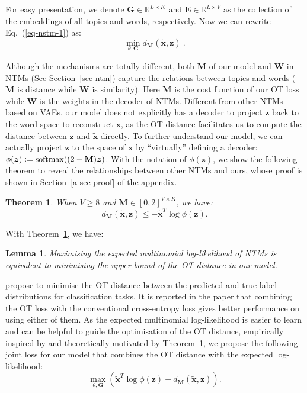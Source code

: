 \documentclass{article}
\newtheorem{thm}{Theorem}
\newtheorem{lemma}{Lemma}
\renewcommand{\vec}{\boldsymbol}
\newcommand{\matr}[1]{\mathbf{#1}}
\newcommand{\eqdef}{\vcentcolon=}
\begin{document}
For easy presentation, we denote $\matr{G} \in \mathbb{R}^{L \times K}$ and $\matr{E} \in \mathbb{R}^{L \times V}$ as the collection of the embeddings of all topics and words, respectively. Now we can rewrite Eq.~(\ref{eq-nstm-1}) as:
\begin{equation}
\label{eq-nstm-2}
\min_{\theta, \matr{G}} d_{\matr{M}}(\tilde{\vec{x}}, \vec{z})~.
\end{equation}


Although the mechanisms are totally different, both $\matr{M}$ of our model and $\matr{W}$ in NTMs (See Section~\ref{sec-ntm}) capture the relations between topics and words ($\matr{M}$ is distance while $\matr{W}$ is similarity).
Here $\matr{M}$ is the cost function of our OT loss while $\matr{W}$ is the weights in the decoder of NTMs.
Different from other NTMs based on VAEs, our model does not explicitly has a decoder to project $\vec{z}$ back to the word space to reconstruct $\vec{x}$, as the OT distance facilitates us to compute the distance between $\vec{z}$ and $\tilde{\vec{x}}$ directly.
To further understand our model, we can actually project $\vec{z}$ to the space of $\vec{x}$ by ``virtually'' defining a decoder: $\phi(\vec{z}) \eqdef \text{softmax}((2 - \matr{M}) \vec{z})$. With the notation of $\phi(\vec{z})$, we show the following theorem to reveal the relationships between other NTMs and ours, whose proof is shown in Section~\ref{a-sec-proof} of the appendix.
\begin{thm}
\label{thm}
When $V\ge8$ and $\matr{M} \in [0,2]^{V \times K}$, we have:
\begin{equation}
d_{\matr{M}}(\tilde{\vec{x}}, \vec{z}) \le - \tilde{\vec{x}}^T \log{\phi(\vec{z})}.
\end{equation} 
\end{thm}

With Theorem~\ref{thm}, we have:
\begin{lemma}
Maximising the expected multinomial log-likelihood of NTMs is equivalent to minimising the upper bound of the OT distance in our model.
\end{lemma}

\citet{frogner2015learning} propose to minimise the OT distance between the predicted and true label distributions for classification tasks.
It is reported in the paper that combining the OT loss with the conventional cross-entropy loss gives better performance on using either of them.
As the expected multinomial log-likelihood is easier to learn and can be helpful to guide the optimisation of the OT distance, empirically inspired by \citet{frogner2015learning} and theoretically motivated by Theorem~\ref{thm}, we propose the following joint loss for our model that combines the OT distance with the expected log-likelihood:
\begin{equation}
\label{eq-final-loss-0}
\max_{\theta, \matr{G}} \left(\tilde{\vec{x}}^T \log \phi(\vec{z}) - d_{\matr{M}}(\tilde{\vec{x}}, \vec{z})\right).
\end{equation}
\end{document}
